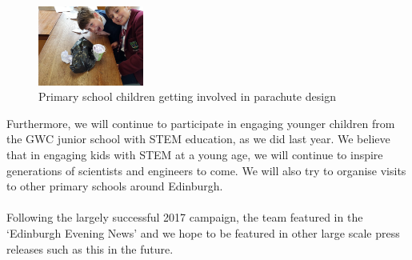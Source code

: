 \documentclass{report}
\begin{document}
		\begin{figure}
			\vspace{-30pt}
	 		\begin{center}
			\includegraphics[width=0.31\textwidth]{p5s}
			\end{center}
			\vspace{-15pt}
			\caption[X]{Primary school children getting involved in parachute design}
		\end{figure}

		\noindent
		Furthermore, we will continue to participate in engaging younger children
		from the GWC junior school with STEM education, as we did last year.
		We believe that in engaging kids with STEM at a young age, we will continue
		to inspire generations of scientists and engineers to come. We will also
		try to organise visits to other primary schools around Edinburgh.\\\\
		Following the largely successful 2017 campaign, the team featured in the
		 `Edinburgh Evening News' and we hope to be
		featured in other large scale press releases such as this in the future.
\end{document}
